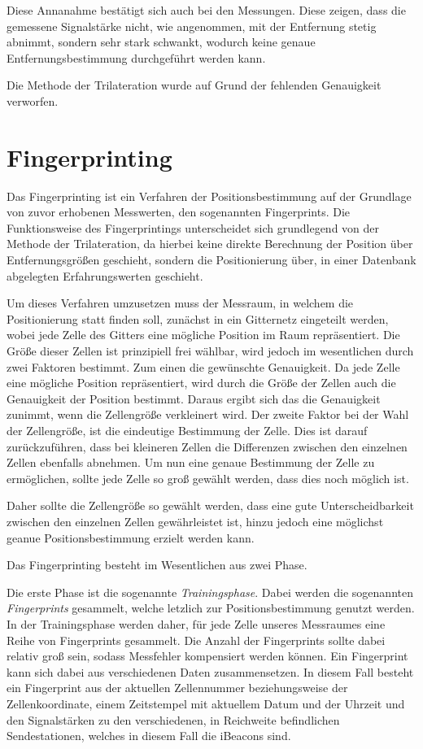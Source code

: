 Diese Annanahme bestätigt sich auch bei den Messungen. Diese zeigen, dass die gemessene Signalstärke nicht, wie angenommen, mit der Entfernung stetig abnimmt, sondern sehr stark schwankt, wodurch keine genaue Entfernungsbestimmung durchgeführt werden kann.

Die Methode der Trilateration wurde auf Grund der fehlenden Genauigkeit verworfen. 

\section{Fingerprinting}
\label{sec:implementation:fingerprinting}
Das Fingerprinting ist ein Verfahren der Positionsbestimmung auf der Grundlage von zuvor erhobenen Messwerten, den sogenannten Fingerprints.
Die Funktionsweise des Fingerprintings unterscheidet sich grundlegend von der Methode der Trilateration, da hierbei keine direkte Berechnung der Position über Entfernungsgrößen geschieht, sondern die Positionierung über, in einer Datenbank abgelegten Erfahrungswerten geschieht.

Um dieses Verfahren umzusetzen muss der Messraum, in welchem die Positionierung statt finden soll, zunächst in ein Gitternetz eingeteilt werden, wobei jede Zelle des Gitters eine mögliche Position im Raum repräsentiert. Die Größe dieser Zellen ist prinzipiell frei wählbar, wird jedoch im wesentlichen durch zwei Faktoren bestimmt. 
Zum einen die gewünschte Genauigkeit. Da jede Zelle eine mögliche Position repräsentiert, wird durch die Größe der Zellen auch die Genauigkeit der Position bestimmt. Daraus ergibt sich das die Genauigkeit zunimmt, wenn die Zellengröße verkleinert wird.
Der zweite Faktor bei der Wahl der Zellengröße, ist die eindeutige Bestimmung der Zelle. Dies ist darauf zurückzuführen, dass bei kleineren Zellen die Differenzen zwischen den einzelnen Zellen ebenfalls abnehmen. Um nun eine genaue Bestimmung der Zelle zu ermöglichen, sollte jede Zelle so groß gewählt werden, dass dies noch möglich ist.

Daher sollte die Zellengröße so gewählt werden, dass eine gute Unterscheidbarkeit zwischen den einzelnen Zellen gewährleistet ist, hinzu jedoch eine möglichst geanue Positionsbestimmung erzielt werden kann.


Das Fingerprinting besteht im Wesentlichen aus zwei Phase.

Die erste Phase ist die sogenannte \emph{Trainingsphase}. Dabei werden die sogenannten \emph{Fingerprints} gesammelt, welche letzlich zur Positionsbestimmung genutzt werden. 
In der Trainingsphase werden daher, für jede Zelle unseres Messraumes eine Reihe von Fingerprints gesammelt. Die Anzahl der Fingerprints sollte dabei relativ groß sein, sodass Messfehler kompensiert werden können. 
Ein Fingerprint kann sich dabei aus verschiedenen Daten zusammensetzen. 
In diesem Fall besteht ein Fingerprint aus der aktuellen Zellennummer beziehungsweise der Zellenkoordinate, einem Zeitstempel mit aktuellem Datum und der Uhrzeit und den Signalstärken zu den verschiedenen, in Reichweite befindlichen Sendestationen, welches in diesem Fall die iBeacons sind.

